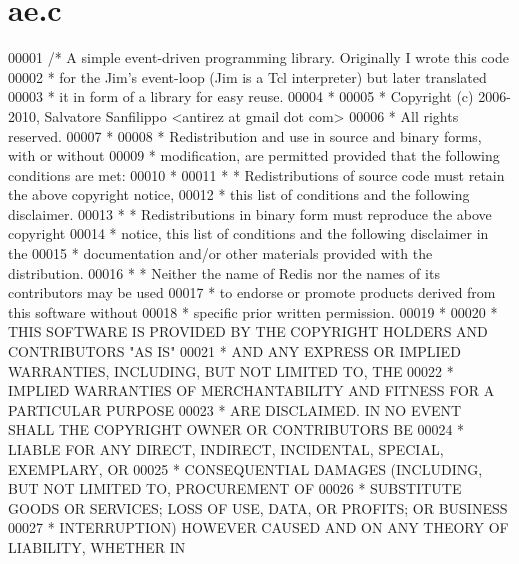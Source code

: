 \hypertarget{ae_8c_source}{}\section{ae.\+c}
\label{ae_8c_source}

\begin{DoxyCode}
00001 \textcolor{comment}{/* A simple event-driven programming library. Originally I wrote this code}
00002 \textcolor{comment}{ * for the Jim's event-loop (Jim is a Tcl interpreter) but later translated}
00003 \textcolor{comment}{ * it in form of a library for easy reuse.}
00004 \textcolor{comment}{ *}
00005 \textcolor{comment}{ * Copyright (c) 2006-2010, Salvatore Sanfilippo <antirez at gmail dot com>}
00006 \textcolor{comment}{ * All rights reserved.}
00007 \textcolor{comment}{ *}
00008 \textcolor{comment}{ * Redistribution and use in source and binary forms, with or without}
00009 \textcolor{comment}{ * modification, are permitted provided that the following conditions are met:}
00010 \textcolor{comment}{ *}
00011 \textcolor{comment}{ *   * Redistributions of source code must retain the above copyright notice,}
00012 \textcolor{comment}{ *     this list of conditions and the following disclaimer.}
00013 \textcolor{comment}{ *   * Redistributions in binary form must reproduce the above copyright}
00014 \textcolor{comment}{ *     notice, this list of conditions and the following disclaimer in the}
00015 \textcolor{comment}{ *     documentation and/or other materials provided with the distribution.}
00016 \textcolor{comment}{ *   * Neither the name of Redis nor the names of its contributors may be used}
00017 \textcolor{comment}{ *     to endorse or promote products derived from this software without}
00018 \textcolor{comment}{ *     specific prior written permission.}
00019 \textcolor{comment}{ *}
00020 \textcolor{comment}{ * THIS SOFTWARE IS PROVIDED BY THE COPYRIGHT HOLDERS AND CONTRIBUTORS "AS IS"}
00021 \textcolor{comment}{ * AND ANY EXPRESS OR IMPLIED WARRANTIES, INCLUDING, BUT NOT LIMITED TO, THE}
00022 \textcolor{comment}{ * IMPLIED WARRANTIES OF MERCHANTABILITY AND FITNESS FOR A PARTICULAR PURPOSE}
00023 \textcolor{comment}{ * ARE DISCLAIMED. IN NO EVENT SHALL THE COPYRIGHT OWNER OR CONTRIBUTORS BE}
00024 \textcolor{comment}{ * LIABLE FOR ANY DIRECT, INDIRECT, INCIDENTAL, SPECIAL, EXEMPLARY, OR}
00025 \textcolor{comment}{ * CONSEQUENTIAL DAMAGES (INCLUDING, BUT NOT LIMITED TO, PROCUREMENT OF}
00026 \textcolor{comment}{ * SUBSTITUTE GOODS OR SERVICES; LOSS OF USE, DATA, OR PROFITS; OR BUSINESS}
00027 \textcolor{comment}{ * INTERRUPTION) HOWEVER CAUSED AND ON ANY THEORY OF LIABILITY, WHETHER IN}

\end{DoxyCode}
